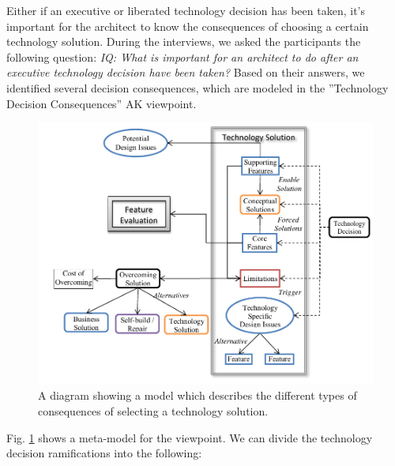 \documentclass[conference]{IEEEtran}
\begin{document}
Either if an executive or liberated technology decision has been taken, it's
important for the architect to know the consequences of choosing a certain
technology solution. During the interviews, we asked the participants the
following question: \textit{IQ: What is important for an architect to do after
an executive technology decision have been taken?} Based on their answers, we
identified several decision consequences, which are modeled in the ''Technology
Decision Consequences'' AK viewpoint.
\begin{figure}
	\centering
		\includegraphics[scale=0.5]{TechnologyDecisionConsequences.pdf}
	\caption{A diagram showing a model which describes the different types of
	consequences of selecting a technology solution.}
	\label{fig:TechnologyDecisionConsequences}
\end{figure}
Fig. \ref{fig:TechnologyDecisionConsequences} shows a meta-model for the
viewpoint. We can divide the technology decision ramifications into the
following:
\end{document}
